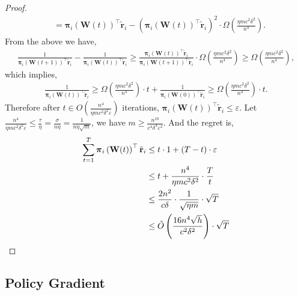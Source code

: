 \documentclass[10pt]{article}
\def\rvtilder{{\tilde{\mathbf{r}}}}
\def\rvpi{{\boldsymbol{\pi}}}
\def\rmW{{\mathbf{W}}}
\begin{document}
\begin{proof}
\begin{equation*}
\begin{split}
    &= \rvpi_i\left( \rmW(t) \right)^\top \rvtilder_i - \left( \rvpi_i\left( \rmW(t) \right)^\top \rvtilder_i \right)^2 \cdot \Omega\left( \frac{\eta m c^2 \delta^2}{n^4} \right).
\end{split}
\end{equation*}
From the above we have,
\begin{equation*}
\begin{split}
    \frac{1}{\rvpi_i\left( \rmW(t+1) \right)^\top \rvtilder_i} - \frac{1}{\rvpi_i\left( \rmW(t) \right)^\top \rvtilder_i} \ge \frac{\rvpi_i\left( \rmW(t) \right)^\top \rvtilder_i}{\rvpi_i\left( \rmW(t+1) \right)^\top \rvtilder_i} \cdot \Omega\left( \frac{\eta m c^2 \delta^2}{n^4} \right) \ge \Omega\left( \frac{\eta m c^2 \delta^2}{n^4} \right),
\end{split}
\end{equation*}
which implies,
\begin{equation*}
\begin{split}
    \frac{1}{\rvpi_i\left( \rmW(t) \right)^\top \rvtilder_i} \ge \Omega\left( \frac{\eta m c^2 \delta^2}{n^4} \right) \cdot t + \frac{1}{\rvpi_i\left( \rmW(0) \right)^\top \rvtilder_i} \ge \Omega\left( \frac{\eta m c^2 \delta^2}{n^4} \right) \cdot t.
\end{split}
\end{equation*}
Therefore after $t \in O\left( \frac{n^4}{\eta m c^2 \delta^2 \varepsilon} \right)$ iterations, $\rvpi_i\left( \rmW(t) \right)^\top \rvtilder_i \le \varepsilon$. Let $\frac{n^4}{\eta m c^2 \delta^2 \varepsilon} \le \frac{\tau}{\eta} = \frac{\sigma}{n \eta} = \frac{1}{n \eta \sqrt{m}}$, we have $m \ge \frac{n^{10}}{c^4 \delta^4 \varepsilon^2}$. And the regret is,
\begin{equation*}
\begin{split}
    \sum\limits_{t=1}^{T}{ \rvpi_i\left( \rmW(t) \right)^\top \rvtilder_i } &\le t \cdot 1 + \left(T - t\right) \cdot \varepsilon \\
    &\le t + \frac{n^4}{\eta m c^2 \delta^2} \cdot \frac{T}{t} \\
    &\le \frac{2 n^2}{c \delta} \cdot \frac{1}{\sqrt{\eta m}} \cdot \sqrt{T} \\
    &\le \tilde{O}\left(\frac{16 n^4 \sqrt{h}}{c^2 \delta^2}\right) \cdot \sqrt{T} \qedhere
\end{split}
\end{equation*}
\end{proof}

\subsection{Policy Gradient}
\end{document}
